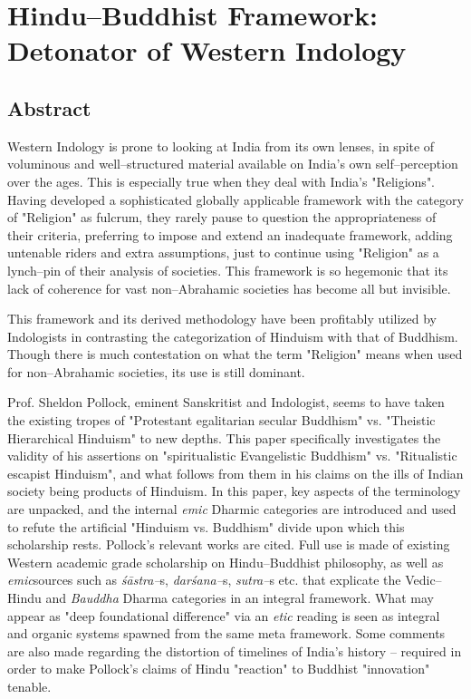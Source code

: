 
\chapter{Hindu–Buddhist Framework: Detonator of Western Indology}\label{chapter3}



\section*{Abstract}

Western Indology is prone to looking at India from its own lenses, in spite of voluminous and well–structured material available on India's own self–perception over the ages. This is especially true when they deal with India's "Religions". Having developed a sophisticated globally applicable framework with the category of "Religion" as fulcrum, they rarely pause to question the appropriateness of their criteria, preferring to impose and extend an inadequate framework, adding untenable riders and extra assumptions, just to continue using "Religion" as a lynch–pin of their analysis of societies. This framework is so hegemonic that its lack of coherence for vast non–Abrahamic societies has become all but invisible.

This framework and its derived methodology have been profitably utilized by Indologists in contrasting the categorization of Hinduism with that of Buddhism. Though there is much contestation on what the term "Religion" means when used for non–Abrahamic societies, its use is still dominant.

Prof. Sheldon Pollock, eminent Sanskritist and Indologist, seems to have taken the existing tropes of "Protestant egalitarian secular Buddhism" vs. "Theistic Hierarchical Hinduism" to new depths. This paper specifically investigates the validity of his assertions on "spiritualistic Evangelistic Buddhism" vs. "Ritualistic escapist Hinduism", and what follows from them in his claims on the ills of Indian society being products of Hinduism. In this paper, key aspects of the terminology are unpacked, and the internal \textit{emic} Dharmic categories are introduced and used to refute the artificial "Hinduism vs. Buddhism" divide upon which this scholarship rests. Pollock's relevant works are cited. Full use is made of existing Western academic grade scholarship on Hindu–Buddhist philosophy, as well as \textit{emic}sources such as \textit{śāstra–}s, \textit{darśana–}s, \textit{sutra–}s etc. that explicate the Vedic–Hindu and \textit{Bauddha} Dharma categories in an integral framework. What may appear as "deep foundational difference" via an \textit{etic} reading is seen as integral and organic systems spawned from the same meta framework. Some comments are also made regarding the distortion of timelines of India's history – required in order to make Pollock's claims of Hindu "reaction" to Buddhist "innovation" tenable.


